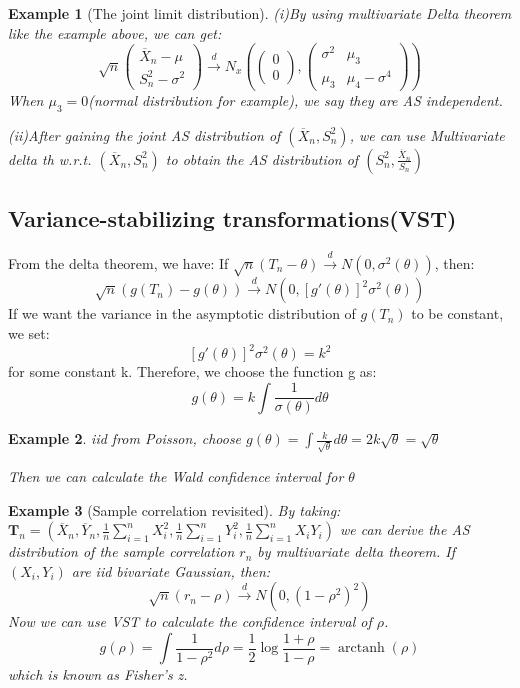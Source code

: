 \documentclass{ctexart}
\newtheorem{example}{Example}[subsection]
\begin{document}
\begin{example}[The joint limit distribution]
  (i)By using multivariate Delta theorem like the example above, we can get: 
  \[
  \sqrt{n}\begin{pmatrix}
    \overline{X}_{n}-\mu\\S_{n}^{2}-\sigma^{2}
  \end{pmatrix}\xrightarrow{d}N_x\left( \begin{pmatrix}
    0\\0
  \end{pmatrix},\begin{pmatrix}
    \sigma^{2}&\mu_{3}\\\mu_{3}&\mu_{4}-\sigma^{4}
  \end{pmatrix} \right)
  \] 
  When \(\mu_{3}=0\)(normal distribution for example), we say they are AS independent. 
  
  (ii)After gaining the joint AS distribution of \((\overline{X}_n,S_{n}^{2})\), we can use Multivariate delta th w.r.t.  \((\overline{X}_n,S_{n}^{2})\) to obtain the AS 
  distribution of \((S_{n}^{2},\frac{\overline{X}_{n}}{S_{n}})\) 
\end{example}
\subsection{Variance-stabilizing transformations(VST)}
From the delta theorem, we have: If \(\sqrt{n}(T_{n}-\theta)\xrightarrow{d}N(0,\sigma^{2}(\theta))\), then: 
\[
\sqrt{n}(g(T_{n})-g(\theta))\xrightarrow{d }N(0,[g'(\theta)]^{2}\sigma^{2}(\theta))
\] 
If we want the variance in the asymptotic distribution of \(g(T_{n})\) to be constant, we set: 
\[
[g'(\theta)]^{2}\sigma^{2}(\theta)=k^{2}
\]  
for some constant k. Therefore, we choose the function g as: 
\[
g(\theta)=k\int \frac{1}{\sigma(\theta)}d \theta
\] 
\begin{example}
  iid from Poisson, choose \(g(\theta)=\int \frac{k}{\sqrt{\theta}}d \theta=2k\sqrt{\theta}=\sqrt{\theta}\) 

  Then we can calculate the Wald confidence interval for \(\theta\) 
\end{example}
\begin{example}[Sample correlation revisited]
  By taking: \(\boldsymbol{T}_n=\left( \overline{X}_{n},\overline{Y}_{n},\frac{1}{n}\sum_{i=1}^{n} X_{i}^{2},\frac{1}{n}\sum_{i=1}^{n} Y_{i}^{2},\frac{1}{n}\sum_{i=1}^{n} X_{i}Y_{i} \right)\) 
  we can derive the AS distribution of the sample correlation \(r_{n}\)  by multivariate delta theorem. If \((X_{i},Y_{i})\) are iid bivariate Gaussian, then: 
  \[
  \sqrt{n}(r_{n}-\rho) \xrightarrow{d}N(0,(1-\rho^{2})^{2})
  \]  
  Now we can use VST to calculate the confidence interval of \(\rho\).
  \[
  g(\rho)=\int \frac{1}{1-\rho^{2}}d \rho=\frac{1}{2}\log \frac{1+\rho}{1-\rho}=\operatorname{arctanh}(\rho)
  \] 
  which is known as Fisher's z.
\end{example}
\end{document}
